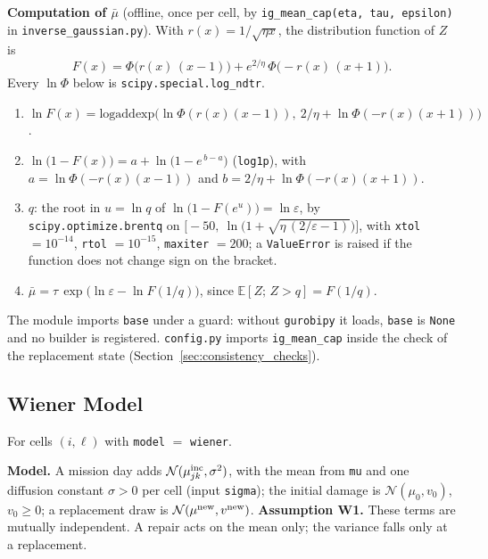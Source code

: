 \textbf{Computation of $\bar\mu$} (offline, once per cell, by
\texttt{ig\_mean\_cap(eta, tau, epsilon)} in \texttt{inverse\_gaussian.py}). With
$r(x) = 1/\sqrt{\eta x}$, the distribution function of $Z$ is
\[
  F(x) = \Phi\bigl(r(x)\,(x - 1)\bigr) + e^{2/\eta}\,\Phi\bigl(-r(x)\,(x + 1)\bigr).
\]
Every $\ln\Phi$ below is \texttt{scipy.special.log\_ndtr}.
\begin{enumerate}[leftmargin=1.5em, nosep]
  \item $\ln F(x) = \mathrm{logaddexp}\bigl(\ln\Phi(r(x)(x-1)),\ 2/\eta + \ln\Phi(-r(x)(x+1))\bigr)$.
  \item $\ln\bigl(1 - F(x)\bigr) = a + \ln\bigl(1 - e^{\,b-a}\bigr)$ (\texttt{log1p}), with
        $a = \ln\Phi(-r(x)(x-1))$ and $b = 2/\eta + \ln\Phi(-r(x)(x+1))$.
  \item $q$: the root in $u = \ln q$ of $\ln\bigl(1 - F(e^u)\bigr) = \ln\varepsilon$, by
        \texttt{scipy.optimize.brentq} on $\bigl[-50,\ \ln\bigl(1 + \sqrt{\eta\,(2/\varepsilon - 1)}\bigr)\bigr]$,
        with \texttt{xtol} $= 10^{-14}$, \texttt{rtol} $= 10^{-15}$, \texttt{maxiter} $= 200$; a
        \texttt{ValueError} is raised if the function does not change sign on the bracket.
  \item $\bar\mu = \tau\,\exp\bigl(\ln\varepsilon - \ln F(1/q)\bigr)$, since $\mathbb{E}[Z;\, Z > q] = F(1/q)$.
\end{enumerate}
The module imports \texttt{base} under a guard: without \texttt{gurobipy} it loads, \texttt{base} is
\texttt{None} and no builder is registered. \texttt{config.py} imports \texttt{ig\_mean\_cap} inside the check
of the replacement state (Section~\ref{sec:consistency_checks}).

\subsection{Wiener Model}
\label{sec:dyn_wiener}

For cells $(i,\ell)$ with \texttt{model} $=$ \texttt{wiener}.

\textbf{Model.} A mission day adds $\mathcal{N}(\mu^{\mathrm{inc}}_{jk}, \sigma^2)$, with
the mean from \texttt{mu} and one diffusion constant $\sigma > 0$ per cell (input
\texttt{sigma}); the initial damage is $\mathcal{N}(\mu_0, v_0)$, $v_0 \geq 0$; a
replacement draw is $\mathcal{N}(\mu^{\mathrm{new}}, v^{\mathrm{new}})$. \textbf{Assumption W1.} These
terms are mutually independent. A repair acts on the mean only; the variance falls
only at a replacement.


